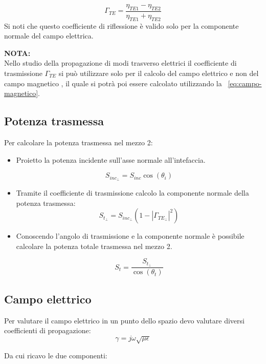 \documentclass[10pt,a4paper]{report}
\begin{document}
			\[
			\Gamma_{TE}=\frac{\eta_{TE1}-\eta_{TE2}}{\eta_{TE1}+\eta_{TE2}}
			\]
			 Si noti che questo coefficiente di riflessione è valido solo per la componente normale del campo elettrica.

			 \textbf{NOTA:}
			 \\ 
			 Nello studio della propagazione di modi trasverso elettrici il coefficiente di trasmissione $\Gamma_{TE}$ si può utilizzare solo per il calcolo del campo elettrico e non del campo magnetico , il quale si potrà poi essere calcolato utilizzando la ~\ref{eq:campo-magnetico}.

		\subsection{Potenza trasmessa}

			Per calcolare la potenza trasmessa nel mezzo 2:
			\begin{itemize}
			\item Proietto la potenza incidente sull'asse normale all'intefaccia.

			\begin{equation}
			S_{inc_\perp}=S_{inc}\cos(\theta_i)
			\end{equation}

			\item Tramite il coefficiente di trasmissione calcolo la componente normale della potenza trasmessa:
			\begin{equation}
			S_{t_\perp}=S_{inc_\perp}(1-|\Gamma_{TE_\perp}|^2)
			\end{equation}

			\item Conoscendo l'angolo di trasmissione e la componente normale è possibile calcolare la potenza totale trasmessa nel mezzo 2.

			\begin{equation}
			S_{t}=\frac{S_{t_\perp}}{\cos(\theta_t)}
			\end{equation}
			\end{itemize}
		\subsection{Campo elettrico}

			Per valutare il campo elettrico in un punto dello spazio devo valutare diversi coefficienti di propagazione:
			\[
			\gamma=j\omega\sqrt{\mu\epsilon}\]

			Da cui ricavo le due componenti:
\end{document}
